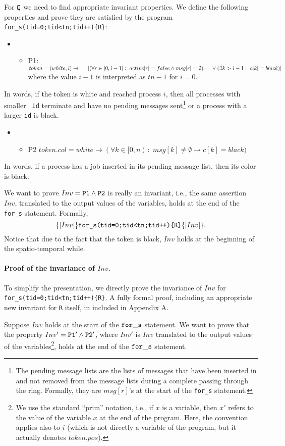 \documentclass[runningheads]{llncs}
\newcommand{\1}{\u{a}}
\newcommand{\2}{\c{s}}
\newcommand{\5}{\c{t}}
\newcommand{\8}{\^{\i}}
\newcommand{\9}{\^{a}}
\newcommand{\svsp}{\vspace{1ex}}
\newcommand{\snvsp}{\vspace{-1ex}}
\newcommand{\bi}{\begin{itemize}}
\newcommand{\ei}{\end{itemize}}
\newcommand{\foo}[1]{\footnote{#1}}
\newcommand{\ra}{\rightarrow}
\newcommand{\co}{\,\colon\;}
\begin{document}
For ${\tt Q}$ we need to find appropriate invariant properties. We define the following properties and prove
they are satisfied by the program {\tt for\_s(tid=0;tid<tn;tid++)\{R\}}:\snvsp
\bi\item[]\bi\item[P1:]$token=(white,i)\ra \\
\hspace*{.5cm}[(\forall r\in[0,i-1]\co active[r]=false\wedge msg[r]=\emptyset)\\
\hspace*{.5cm}\vee(\exists k>i-1\co c[k]=black)]$\\ where the value $i-1$ is interpreted as $tn-1$ for
$i=0$.\snvsp\ei\ei In words, if the token is white and reached process $i$, then all processes with smaller {\tt
id} terminate and have no pending messages sent\foo{The pending message lists are the lists of messages that
have been inserted in and not removed from the message lists during a complete passing through the
ring. Formally, they are $msg[r]$'s at the start of the {\tt for\_s} statement.} or a process with a larger
{\tt id} is black.  \snvsp 
\bi\item[]\bi\item[P2]$token.col=white\ra(\forall k\in [0,n)\co msg[k]\not=\emptyset\ra c[k]=black)$\snvsp\ei\ei 
In words, if a process has a job inserted in its pending message list, then its color is black.\svsp

We want to prove $Inv={\tt P1\wedge P2}$ is really an invariant, i.e., the same assertion $Inv$, translated to
the output values of the variables, holds at the end of the {\tt for\_s} statement. Formally,
\snvsp$$\{|Inv|\} \mbox{\tt for\_s(tid=0;tid<tn;tid++)\{R\}} \{|Inv|\}.\snvsp$$ Notice that due to the fact
that the token is black, $Inv$ holds at the beginning of the spatio-temporal while.

\paragraph{Proof of the invariance of $Inv$.}

To simplify the presentation, we directly prove the invariance of $Inv$ for \mbox{\tt
for\_s(tid=0;tid<tn;tid++)\{R\}}. A fully formal proof, including an appropriate new invariant for {\tt R}
itself, in included in Appendix A.

Suppose $Inv$ holds at the start of the ${\tt for\_s}$ statement. We want to prove that the property
$Inv'={\tt P1'\wedge P2'}$, where $Inv'$ is $Inv$ translated to the output values of the variables\foo{
We use the standard ``prim'' notation, i.e., if $x$ is a variable, then $x'$ refers to the value of the
variable $x$ at the end of the program. Here, the convention applies also to $i$ (which is not directly a
variable of the program, but it actually denotes $token.pos$).}, holds at the end of the ${\tt for\_s}$
statement.
\end{document}
